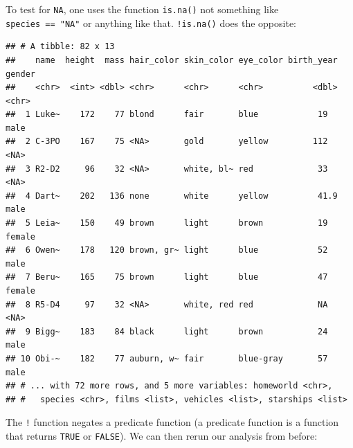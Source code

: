 \documentclass[]{gitbook}
\newenvironment{Shaded}{\begin{snugshade}}{\end{snugshade}}
\newcommand{\DataTypeTok}[1]{\textcolor[rgb]{0.13,0.29,0.53}{#1}}
\newcommand{\DecValTok}[1]{\textcolor[rgb]{0.00,0.00,0.81}{#1}}
\newcommand{\KeywordTok}[1]{\textcolor[rgb]{0.13,0.29,0.53}{\textbf{#1}}}
\newcommand{\NormalTok}[1]{#1}
\newcommand{\OperatorTok}[1]{\textcolor[rgb]{0.81,0.36,0.00}{\textbf{#1}}}
\newcommand{\OtherTok}[1]{\textcolor[rgb]{0.56,0.35,0.01}{#1}}
\newcommand{\StringTok}[1]{\textcolor[rgb]{0.31,0.60,0.02}{#1}}
\begin{document}
To test for \texttt{NA}, one uses the function \texttt{is.na()} not something like \texttt{species\ ==\ "NA"} or anything
like that. \texttt{!is.na()} does the opposite:

\begin{Shaded}
\end{Shaded}

\begin{verbatim}
## # A tibble: 82 x 13
##    name  height  mass hair_color skin_color eye_color birth_year gender
##    <chr>  <int> <dbl> <chr>      <chr>      <chr>          <dbl> <chr> 
##  1 Luke~    172    77 blond      fair       blue            19   male  
##  2 C-3PO    167    75 <NA>       gold       yellow         112   <NA>  
##  3 R2-D2     96    32 <NA>       white, bl~ red             33   <NA>  
##  4 Dart~    202   136 none       white      yellow          41.9 male  
##  5 Leia~    150    49 brown      light      brown           19   female
##  6 Owen~    178   120 brown, gr~ light      blue            52   male  
##  7 Beru~    165    75 brown      light      blue            47   female
##  8 R5-D4     97    32 <NA>       white, red red             NA   <NA>  
##  9 Bigg~    183    84 black      light      brown           24   male  
## 10 Obi-~    182    77 auburn, w~ fair       blue-gray       57   male  
## # ... with 72 more rows, and 5 more variables: homeworld <chr>,
## #   species <chr>, films <list>, vehicles <list>, starships <list>
\end{verbatim}

The \texttt{!} function negates a predicate function (a predicate function is a function that returns
\texttt{TRUE} or \texttt{FALSE}). We can then rerun our analysis from before:

\begin{Shaded}
\end{Shaded}
\end{document}
